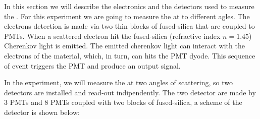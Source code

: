 In this section we will describe the electronics and the detectors used to measure the \transv .
For this experiment we are going to measure the \transv at to different agles. The electrons detection is 
made via two thin blocks of fused-silica that are coupled to PMTs. When a scattered electron hit the fused-silica (refractive index $n = 1.45$) Cherenkov light is emitted. The emitted cherenkov light can interact with the electrons of the material, which, in turn, can hits the PMT dyode. This sequence of event triggers the PMT and produce an output signal.

In the experiment, we will measure the \transv at two angles of scattering, so two detectors are installed and read-out indipendently. The two detector are made by 3 PMTs and 8 PMTs coupled with two blocks of fused-silica, a scheme of the detector is shown below:

\begin{figure}[hbtp]
\centering
{}
\end{figure}


